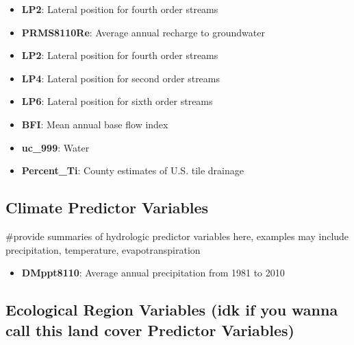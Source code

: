 \documentclass[
]{article}
\providecommand{\tightlist}{%
  \setlength{\itemsep}{0pt}\setlength{\parskip}{0pt}}
\begin{document}
\begin{itemize}
\tightlist
\item
  \textbf{LP2}: Lateral position for fourth order streams
\item
  \textbf{PRMS8110Re}: Average annual recharge to groundwater
\item
  \textbf{LP2}: Lateral position for fourth order streams
\item
  \textbf{LP4}: Lateral position for second order streams
\item
  \textbf{LP6}: Lateral position for sixth order streams
\item
  \textbf{BFI}: Mean annual base flow index
\item
  \textbf{uc\_999}: Water
\item
  \textbf{Percent\_Ti}: County estimates of U.S. tile drainage
\end{itemize}

\hypertarget{climate-predictor-variables}{%
\subsection{Climate Predictor
Variables}\label{climate-predictor-variables}}

\#provide summaries of hydrologic predictor variables here, examples may
include precipitation, temperature, evapotranspiration

\begin{itemize}
\tightlist
\item
  \textbf{DMppt8110}: Average annual precipitation from 1981 to 2010
\end{itemize}

\hypertarget{ecological-region-variables-idk-if-you-wanna-call-this-land-cover-predictor-variables}{%
\subsection{Ecological Region Variables (idk if you wanna call this land
cover Predictor
Variables)}\label{ecological-region-variables-idk-if-you-wanna-call-this-land-cover-predictor-variables}}
\end{document}
